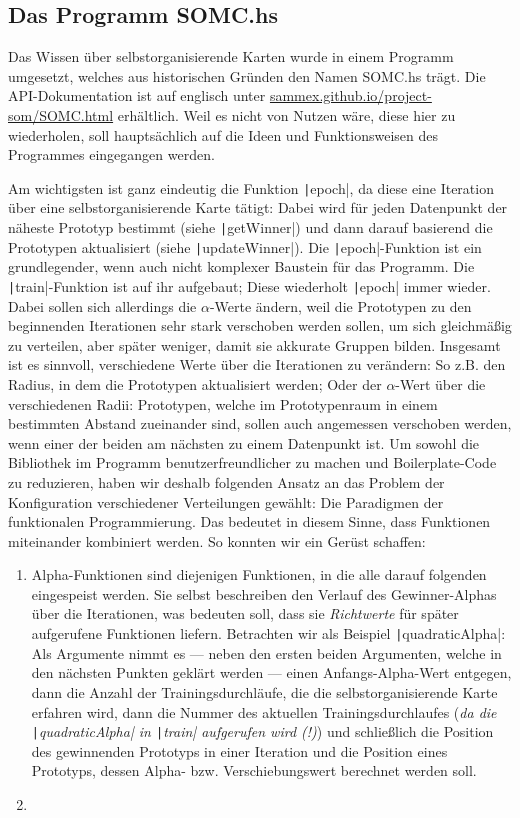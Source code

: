 \documentclass[twoside,a4paper,draft]{article}
\newcommand{\haskell}[1]{\texttt|#1|}
\begin{document}
\subsection{Das Programm \glqq{}SOMC.hs\grqq{}}

Das Wissen über selbstorganisierende Karten wurde in einem Programm umgesetzt, welches aus historischen Gründen den Namen SOMC.hs trägt. Die API-Dokumentation ist auf englisch unter \url{sammex.github.io/project-som/SOMC.html} erhältlich. Weil es nicht von Nutzen wäre, diese hier zu wiederholen, soll hauptsächlich auf die Ideen und Funktionsweisen des Programmes eingegangen werden.

Am wichtigsten ist ganz eindeutig die Funktion \haskell{epoch}, da diese eine Iteration über eine selbstorganisierende Karte tätigt: Dabei wird für jeden Datenpunkt der näheste Prototyp bestimmt (siehe \haskell{getWinner}) und dann darauf basierend die Prototypen aktualisiert (siehe \haskell{updateWinner}). Die \haskell{epoch}-Funktion ist ein grundlegender, wenn auch nicht komplexer Baustein für das Programm. Die \haskell{train}-Funktion ist auf ihr aufgebaut; Diese wiederholt \haskell{epoch} immer wieder. Dabei sollen sich allerdings die \(\alpha\)-Werte ändern, weil die Prototypen zu den beginnenden Iterationen sehr stark verschoben werden sollen, um sich gleichmäßig zu verteilen, aber später weniger, damit sie akkurate Gruppen bilden. Insgesamt ist es sinnvoll, verschiedene Werte über die Iterationen zu verändern: So z.B. den Radius, in dem die Prototypen aktualisiert werden; Oder der \(\alpha\)-Wert über die verschiedenen Radii: Prototypen, welche im Prototypenraum in einem bestimmten Abstand zueinander sind, sollen auch angemessen verschoben werden, wenn einer der beiden am nächsten zu einem Datenpunkt ist. Um sowohl die Bibliothek im Programm benutzerfreundlicher zu machen und Boilerplate-Code zu reduzieren, haben wir deshalb folgenden Ansatz an das Problem der Konfiguration verschiedener Verteilungen gewählt: Die Paradigmen der funktionalen Programmierung. Das bedeutet in diesem Sinne, dass Funktionen miteinander kombiniert werden. So konnten wir ein Gerüst schaffen:

\begin{enumerate}
\item Alpha-Funktionen sind diejenigen Funktionen, in die alle darauf folgenden eingespeist werden. Sie selbst beschreiben den Verlauf des Gewinner-Alphas über die Iterationen, was bedeuten soll, dass sie \emph{Richtwerte} für später aufgerufene Funktionen liefern. Betrachten wir als Beispiel \haskell{quadraticAlpha}: Als Argumente nimmt es --- neben den ersten beiden Argumenten, welche in den nächsten Punkten geklärt werden --- einen Anfangs-Alpha-Wert entgegen, dann die Anzahl der Trainingsdurchläufe, die die selbstorganisierende Karte erfahren wird, dann die Nummer des aktuellen Trainingsdurchlaufes (\emph{da die \haskell{quadraticAlpha} in \haskell{train} aufgerufen wird (!)}) und schließlich die Position des gewinnenden Prototyps in einer Iteration und die Position eines Prototyps, dessen Alpha- bzw. Verschiebungswert berechnet werden soll.

\item 
\end{enumerate}
\end{document}
